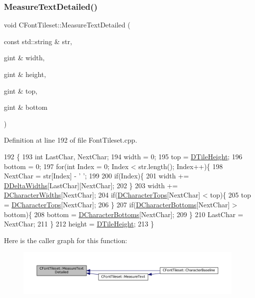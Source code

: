 \subsubsection{\texorpdfstring{Measure\+Text\+Detailed()}{MeasureTextDetailed()}}
{\footnotesize\ttfamily void C\+Font\+Tileset\+::\+Measure\+Text\+Detailed (\begin{DoxyParamCaption}\item[{const std\+::string \&}]{str,  }\item[{gint \&}]{width,  }\item[{gint \&}]{height,  }\item[{gint \&}]{top,  }\item[{gint \&}]{bottom }\end{DoxyParamCaption})}



Definition at line 192 of file Font\+Tileset.\+cpp.


\begin{DoxyCode}
192                                                                                                            
         \{
193     \textcolor{keywordtype}{int} LastChar, NextChar;
194     width = 0;
195     top = \hyperlink{classCGraphicTileset_af48f32e07d5fe69afd5f764318cc3244}{DTileHeight};
196     bottom = 0;
197     \textcolor{keywordflow}{for}(\textcolor{keywordtype}{int} Index = 0; Index < str.length(); Index++)\{
198         NextChar = str[Index] - \textcolor{charliteral}{' '};
199         
200         \textcolor{keywordflow}{if}(Index)\{
201             width += \hyperlink{classCFontTileset_a1e253853e14282e9582a7f47dace8f70}{DDeltaWidths}[LastChar][NextChar]; 
202         \}
203         width += \hyperlink{classCFontTileset_ad25347b5350a8380be8c550d9f2e2798}{DCharacterWidths}[NextChar]; 
204         \textcolor{keywordflow}{if}(\hyperlink{classCFontTileset_aa009ebe41a491d854a5f6005919649c2}{DCharacterTops}[NextChar] < top)\{
205             top = \hyperlink{classCFontTileset_aa009ebe41a491d854a5f6005919649c2}{DCharacterTops}[NextChar];   
206         \}
207         \textcolor{keywordflow}{if}(\hyperlink{classCFontTileset_a13d7063022d59bf3347452c78be50a8b}{DCharacterBottoms}[NextChar] > bottom)\{
208             bottom = \hyperlink{classCFontTileset_a13d7063022d59bf3347452c78be50a8b}{DCharacterBottoms}[NextChar];   
209         \}
210         LastChar = NextChar;
211     \}
212     height = \hyperlink{classCGraphicTileset_af48f32e07d5fe69afd5f764318cc3244}{DTileHeight};
213 \}
\end{DoxyCode}
Here is the caller graph for this function\+:
\nopagebreak
\begin{figure}[H]
\begin{center}
\leavevmode
\includegraphics[width=350pt]{classCFontTileset_a7afa08157a6bea6c0fbd06299685b8b3_icgraph}
\end{center}
\end{figure}


